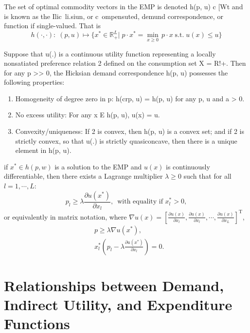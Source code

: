 \documentclass[11pt,fleqn]{book} %
\begin{document}
\begin{definition}
The set of optimal commodity vectors in the EMP is denoted h(p, u) c [Wt and is
known as the Ilic~li.siun, or c~ompensuted, demund correspondence, or function if single-valued. That is
\[
h(\cdot,\cdot):\;(p,u)\mapsto \{x^*\in\mathbb{R}_+^L|\;p\cdot x^*=\min_{x\ge 0}\, p\cdot x\;\mathrm{s.t.}\; u(x)\le u\}
\]	
\end{definition}

\begin{proposition}
	 Suppose that u(.) is a continuous utility function representing a
	locally nonsatiated preference relation 2 defined on the consumption set X = R!+.
	Then for any p >> 0, the Hicksian demand correspondence h(p, u) possesses the
	following properties:
	\begin{enumerate}
		\item Homogeneity of degree zero in p: h(crp, u) = h(p, u) for any p, u and a > 0.
		\item No excess utility: For any x E h(p, u), u(x) = u.
		\item Convexity/uniqueness: If 2 is convex, then h(p, u) is a convex set; and	if 2 is strictly convex, so that u(.) is strictly quasiconcave, then there is
		a unique element in h(p, u).
	\end{enumerate}
\end{proposition}

\begin{theorem}
	if $x^* \in h(p,w)$ is a solution to the EMP and $u(x)$ is continuously differentiable, then there exists a
	Lagrange multiplier $\lambda\ge0$ such that for all $l = 1,\cdots, L$:
	\[
	p_l\ge\lambda\frac{\partial u(x^*)}{\partial x_l}  ,\ \;\text{with equality if } x^*_l > 0,
	\]
	or equivalently in matrix notation, where $\nabla u(x)= \left[\frac{\partial u(x)}{\partial x_l},\frac{\partial u(x)}{\partial x_l},\cdots,\frac{\partial u(x)}{\partial x_L} \right]^\mathrm{T}$,
	\begin{align*}
	& p\ge\lambda\nabla u(x^*) , \\
	&x^*_l\left(p_l-\lambda\frac{\partial u(x^*)}{\partial x_l} \right)= 0.
	\end{align*}
\end{theorem}



\section{Relationships between Demand, Indirect Utility,
	and Expenditure Functions}
\end{document}
